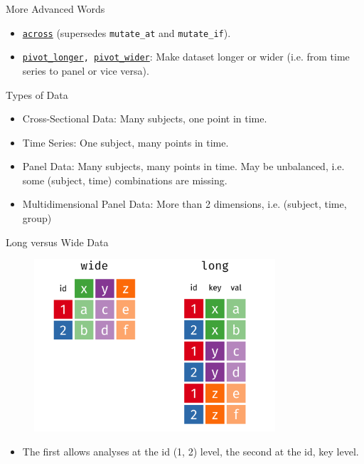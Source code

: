 \documentclass[12pt,aspectratio=169]{beamer}
\begin{document}
\begin{frame}{More Advanced Words}
\begin{itemize}
    \item \texttt{\href{https://dplyr.tidyverse.org/reference/across.html}{across}} (supersedes \texttt{mutate\_at} and \texttt{mutate\_if}).
    \item \texttt{\href{https://tidyr.tidyverse.org/reference/pivot_longer.html}{pivot\_longer}, \href{https://tidyr.tidyverse.org/reference/pivot_wider.html}{pivot\_wider}}: Make dataset longer or wider (i.e. from time series to panel or vice versa).
\end{itemize}
\end{frame}

\begin{frame}{Types of Data}
   \begin{itemize}
   \item Cross-Sectional Data: Many subjects, one point in time.       
   \item Time Series: One subject, many points in time.
   \item Panel Data: Many subjects, many points in time. May be unbalanced, i.e. some (subject, time) combinations are missing.
   \item Multidimensional Panel Data: More than 2 dimensions, i.e. (subject, time, group)
   \end{itemize} 
\end{frame}

\begin{frame}{Long versus Wide Data}
    \begin{figure}
        \centering
        \includegraphics[width=0.8\textwidth,height=0.8\textheight,keepaspectratio]{resources/wide_long_data.png}
        \end{figure}
        \begin{itemize}
            \item The first allows analyses at the id (1, 2) level, the second at the id, key level.
        \end{itemize}
\end{frame}
\end{document}
